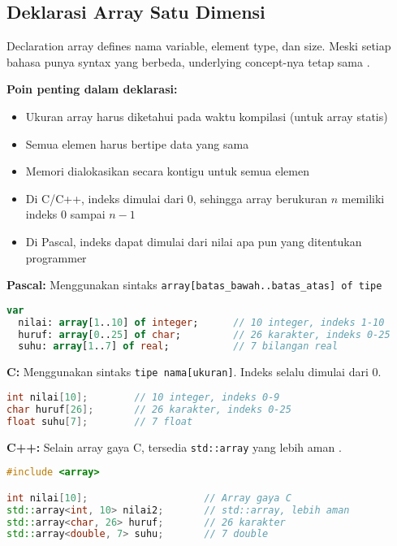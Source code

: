 \documentclass[../main.tex]{subfiles}
\begin{document}
\subsection{Deklarasi Array Satu Dimensi}
Declaration array defines nama variable, element type, dan size. Meski setiap bahasa punya syntax yang berbeda, underlying concept-nya tetap sama \parencite{tutorialspoint-c-arrays,learncpp-arrays,free-pascal-docs,tutorialpemrograman-array-c}.

\textbf{Poin penting dalam deklarasi:}
\begin{itemize}
  \item Ukuran array harus diketahui pada waktu kompilasi (untuk array statis)
  \item Semua elemen harus bertipe data yang sama
  \item Memori dialokasikan secara kontigu untuk semua elemen
  \item Di C/C++, indeks dimulai dari 0, sehingga array berukuran $n$ memiliki indeks 0 sampai $n-1$
  \item Di Pascal, indeks dapat dimulai dari nilai apa pun yang ditentukan programmer
\end{itemize}

\textbf{Pascal:} Menggunakan sintaks \texttt{array[batas\_bawah..batas\_atas] of tipe}
\begin{lstlisting}[language=Pascal, caption={Deklarasi array di Pascal}]
var
  nilai: array[1..10] of integer;      // 10 integer, indeks 1-10
  huruf: array[0..25] of char;         // 26 karakter, indeks 0-25
  suhu: array[1..7] of real;           // 7 bilangan real
\end{lstlisting}

\textbf{C:} Menggunakan sintaks \texttt{tipe nama[ukuran]}. Indeks selalu dimulai dari 0.
\begin{lstlisting}[language=C, caption={Deklarasi array di C}]
int nilai[10];        // 10 integer, indeks 0-9
char huruf[26];       // 26 karakter, indeks 0-25
float suhu[7];        // 7 float
\end{lstlisting}

\textbf{C++:} Selain array gaya C, tersedia \texttt{std::array} yang lebih aman \parencite{cpp-std-array,cppreference-array}.
\begin{lstlisting}[language=C++, caption={Deklarasi array di C++}]
#include <array>

int nilai[10];                    // Array gaya C
std::array<int, 10> nilai2;       // std::array, lebih aman
std::array<char, 26> huruf;       // 26 karakter
std::array<double, 7> suhu;       // 7 double
\end{lstlisting}
\end{document}
